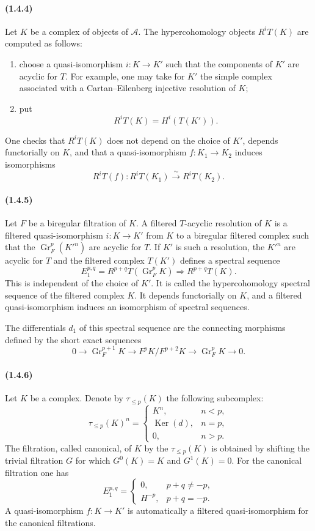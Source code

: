 \documentclass[10pt]{article}
\newcommand{\Gr}{\operatorname{Gr}}
\newcommand{\Ker}{\operatorname{Ker}}
\newcommand{\calA}{\mathcal A}
\newcommand{\iso}{\xrightarrow{\sim}}
\begin{document}
\paragraph{(1.4.4)} Let $K$ be a complex of objects of $\calA$. The hypercohomology objects $R^iT(K)$ are computed as follows:
\begin{enumerate}[label=\alph*)]
\item choose a quasi-isomorphism $i:K\to K'$ such that the components of $K'$ are acyclic for $T$. For example, one may take for $K'$ the simple complex associated with a Cartan--Eilenberg injective resolution of $K$;
\item put
\[
R^iT(K)=H^i(T(K')).
\]
\end{enumerate}
One checks that $R^iT(K)$ does not depend on the choice of $K'$, depends functorially on $K$, and that a quasi-isomorphism $f:K_1\to K_2$ induces isomorphisms
\[
R^iT(f):R^iT(K_1)\iso R^iT(K_2).
\]

\paragraph{(1.4.5)} Let $F$ be a biregular filtration of $K$. A filtered $T$-acyclic resolution of $K$ is a filtered quasi-isomorphism $i:K\to K'$ from $K$ to a biregular filtered complex such that the $\Gr_F^p(K'^n)$ are acyclic for $T$. If $K'$ is such a resolution, the $K'^n$ are acyclic for $T$ and the filtered complex $T(K')$ defines a spectral sequence
\[
E_1^{p,q}=R^{p+q}T(\Gr_F^pK)\Rightarrow R^{p+q}T(K).
\]
This is independent of the choice of $K'$. It is called the hypercohomology spectral sequence of the filtered complex $K$. It depends functorially on $K$, and a filtered quasi-isomorphism induces an isomorphism of spectral sequences.

The differentials $d_1$ of this spectral sequence are the connecting morphisms defined by the short exact sequences
\[
0\to\Gr_F^{p+1}K\to F^pK/F^{p+2}K\to\Gr_F^pK\to0.
\]

\paragraph{(1.4.6)} Let $K$ be a complex. Denote by $\tau_{\le p}(K)$ the following subcomplex:
\[
\tau_{\le p}(K)^n=\begin{cases}
K^n,& n<p,\\
\Ker(d),& n=p,\\
0,& n>p.
\end{cases}
\]
The filtration, called canonical, of $K$ by the $\tau_{\le p}(K)$ is obtained by shifting the trivial filtration $G$ for which $G^0(K)=K$ and $G^1(K)=0$. For the canonical filtration one has
\[
E_1^{p,q}=\begin{cases}
0,& p+q\ne -p,\\
H^{-p},& p+q=-p.
\end{cases}
\]
A quasi-isomorphism $f:K\to K'$ is automatically a filtered quasi-isomorphism for the canonical filtrations.
\end{document}
